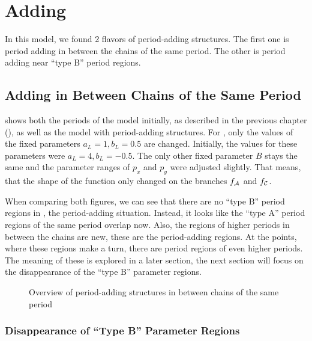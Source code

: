 \chapter{Adding}

In this model, we found 2 flavors of period-adding structures.
The first one is period adding in between the chains of the same period.
The other is period adding near ``type B'' period regions.

\section{Adding in Between Chains of the Same Period}

 shows both the periods of the model initially, as described in the previous chapter (), as well as the model with period-adding structures.
For , only the values of the fixed parameters $a_L = 1, b_L = 0.5$ are changed.
Initially, the values for these parameters were $a_L = 4, b_L = -0.5$.
The only other fixed parameter $B$ stays the same and the parameter ranges of $p_x$ and $p_y$ were adjusted slightly.
That means, that the shape of the function only changed on the branches $f_{\mathcal{A}}$ and $f_{\mathcal{C}}$.

When comparing both figures, we can see that there are no ``type B'' period regions in , the period-adding situation.
Instead, it looks like the ``type A'' period regions of the same period overlap now.
Also, the regions of higher periods in between the chains are new, these are the period-adding regions.
At the points, where these regions make a turn, there are period regions of even higher periods.
The meaning of these is explored in a later section, the next section will focus on the disappearance of the ``type B'' parameter regions.

\begin{figure}
    \centering
    \caption{Overview of period-adding structures in between chains of the same period}
    \label{fig:minrep.adding1.overview}
\end{figure}

\subsection{Disappearance of ``Type B'' Parameter Regions}
\label{sec:minrep.adding.disapp.typeB}

